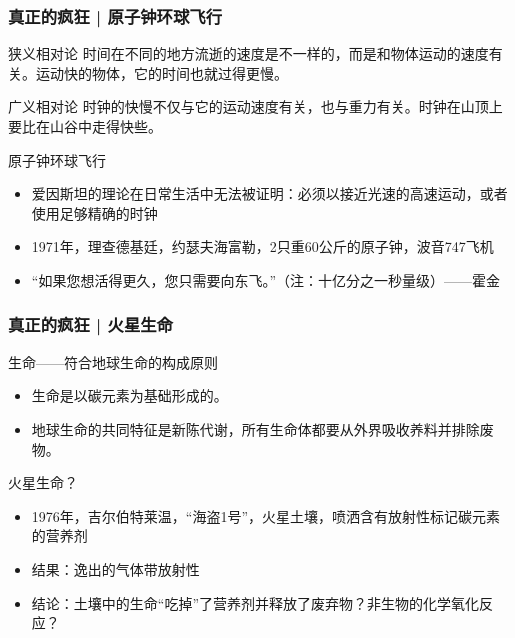 \begin{frame}
  \frametitle{真正的疯狂 | 原子钟环球飞行}
  \begin{block}{狭义相对论}
    时间在不同的地方流逝的速度是不一样的，而是和物体运动的速度有关。运动快的物体，它的时间也就过得更慢。
  \end{block}
  \pause
  \begin{block}{广义相对论}
    时钟的快慢不仅与它的运动速度有关，也与重力有关。时钟在山顶上要比在山谷中走得快些。
  \end{block}
  \pause
  \begin{block}{原子钟环球飞行}
    \begin{itemize}
      \item 爱因斯坦的理论在日常生活中无法被证明：必须以接近光速的高速运动，或者使用足够精确的时钟
      \item 1971年，理查德\textbullet 基廷，约瑟夫\textbullet 海富勒，2只重60公斤的原子钟，波音747飞机
      \item “如果您想活得更久，您只需要向东飞。”（注：十亿分之一秒量级）——霍金
    \end{itemize}
  \end{block}
\end{frame}

\begin{frame}
  \frametitle{真正的疯狂 | 火星生命}
  \begin{block}{生命——符合地球生命的构成原则}
    \begin{itemize}
      \item 生命是以碳元素为基础形成的。
      \item 地球生命的共同特征是新陈代谢，所有生命体都要从外界吸收养料并排除废物。
    \end{itemize}
  \end{block}
  \pause
  \begin{block}{火星生命？}
    \begin{itemize}
      \item 1976年，吉尔伯特\textbullet 莱温，“海盗1号”，火星土壤，喷洒含有放射性标记碳元素的营养剂
      \item 结果：逸出的气体带放射性
      \item 结论：土壤中的生命“吃掉”了营养剂并释放了废弃物？非生物的化学氧化反应？
    \end{itemize}
  \end{block}
\end{frame}

